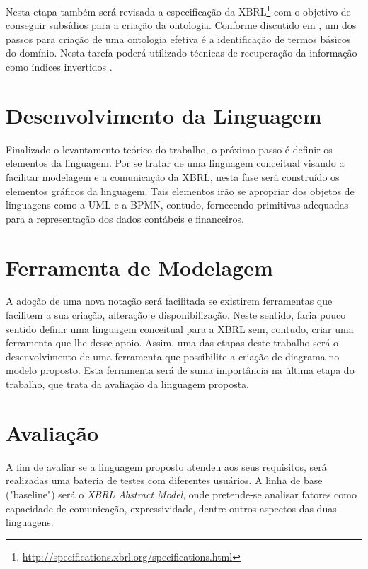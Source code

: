 \documentclass[msc,proposal,hidelot,hideabstract]{ppgccufmg} %
\begin{document}
Nesta etapa também será revisada a especificação da XBRL\footnote{\url{http://specifications.xbrl.org/specifications.html}} com o objetivo de conseguir subsídios para a criação da ontologia. Conforme discutido em \cite{lupacsc2010role}{}, um dos passos para criação de uma ontologia efetiva é a identificação de termos básicos do domínio. Nesta tarefa poderá utilizado técnicas de recuperação da informação como índices invertidos \cite{baeza1999modern}.

\section{Desenvolvimento da Linguagem}
\label{sec:dese_lingugem}

Finalizado o levantamento teórico do trabalho, o próximo passo é definir os elementos da linguagem. Por se tratar de uma linguagem conceitual visando a facilitar modelagem e a comunicação da XBRL, nesta fase será construído os elementos gráficos da linguagem. Tais elementos irão se apropriar dos objetos de linguagens como a UML e a BPMN, contudo, fornecendo primitivas adequadas para a representação dos dados contábeis e financeiros.

\section{Ferramenta de Modelagem}
\label{sec:ferramenta}

A adoção de uma nova notação será facilitada se existirem ferramentas que facilitem a sua criação, alteração e disponibilização. Neste sentido, faria pouco sentido definir uma linguagem conceitual para a XBRL sem, contudo, criar uma ferramenta que lhe desse apoio. Assim, uma das etapas deste trabalho será o desenvolvimento de uma ferramenta que possibilite a criação de diagrama no modelo proposto. Esta ferramenta será de suma importância na última etapa do trabalho, que trata da avaliação da linguagem proposta.

\section{Avaliação}
\label{sec:avaliacao}

A fim de avaliar se a linguagem proposto atendeu aos seus requisitos, será realizadas uma bateria de testes com diferentes usuários. A linha de base ("baseline") será o \textit{XBRL Abstract Model}, onde pretende-se analisar fatores como capacidade de comunicação, expressividade, dentre outros aspectos das duas linguagens.
\end{document}
